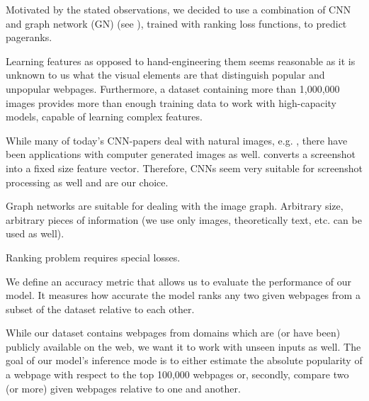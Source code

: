 Motivated by the stated observations, we decided to use a combination of CNN and graph network (GN) (see \cite{deepmind:graphnets}), trained with ranking loss functions, to predict pageranks.

Learning features as opposed to hand-engineering them seems reasonable as it is unknown to us what the visual elements are that distinguish popular and unpopular webpages. Furthermore, a dataset containing more than 1,000,000 images provides more than enough training data to work with high-capacity models, capable of learning complex features.

While many of today's CNN-papers deal with natural images, e.g. \cite{gu2018ava,szegedy2017inception,openai:learningdexterity}, there have been applications with computer generated images as well. \cite{beltramelli:pix2code} converts a screenshot into a fixed size feature vector. Therefore, CNNs seem very suitable for screenshot processing as well and are our choice.

Graph networks are suitable for dealing with the image graph. Arbitrary size, arbitrary pieces of information (we use only images, theoretically text, etc. can be used as well).

Ranking problem requires special losses.

We define an accuracy metric that allows us to evaluate the performance of our model. It measures how accurate the model ranks any two given webpages from a subset of the dataset relative to each other.

While our dataset contains webpages from domains which are (or have been) publicly available on the web, we want it to work with unseen inputs as well. The goal of our model's inference mode is to either estimate the absolute popularity of a webpage with respect to the top 100,000 webpages or, secondly, compare two (or more) given webpages relative to one and another.

